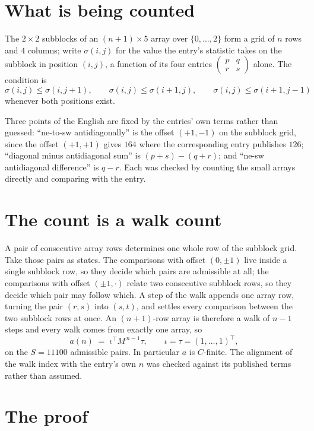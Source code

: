 \documentclass[11pt,a4paper]{article}
\theoremstyle{plain}
\theoremstyle{definition}
\begin{document}
\section{What is being counted}

The $2\times2$ subblocks of an $(n+1)\times5$ array over $\{0,\dots,2\}$ form a grid
of $n$ rows and $4$ columns; write $\sigma(i,j)$ for the value the entry's statistic takes on
the subblock in position $(i,j)$, a function of its four entries
$\begin{pmatrix}p&q\\r&s\end{pmatrix}$ alone. The condition is
\[
\sigma(i,j)\le\sigma(i,j+1),\qquad \sigma(i,j)\le\sigma(i+1,j),\qquad \sigma(i,j)\le\sigma(i+1,j-1)
\]
whenever both positions exist.

Three points of the English are fixed by the entries' own terms rather than guessed:
``ne-to-sw antidiagonally'' is the offset $(+1,-1)$ on the subblock grid, since the offset
$(+1,+1)$ gives $164$ where the corresponding entry publishes $126$; ``diagonal minus
antidiagonal sum'' is $(p+s)-(q+r)$; and ``ne-sw antidiagonal difference'' is $q-r$. Each was
checked by counting the small arrays directly and comparing with the entry.

\section{The count is a walk count}

A pair of consecutive array rows determines one whole row of the subblock grid. Take those
pairs as states. The comparisons with offset $(0,\pm1)$ live inside a single subblock row, so
they decide which pairs are admissible at all; the comparisons with offset $(\pm1,\cdot)$
relate two consecutive subblock rows, so they decide which pair may follow which. A step of the
walk appends one array row, turning the pair $(r,s)$ into $(s,t)$, and settles every comparison
between the two subblock rows at once. An $(n+1)$-row array is therefore a walk of $n-1$ steps
and every walk comes from exactly one array, so
\[
a(n)\;=\;\iota^{\!\top}M^{\,n-1}\tau,\qquad \iota=\tau=(1,\dots,1)^{\!\top},
\]
on the $S=11100$ admissible pairs. In particular $a$ is $C$-finite. The alignment of the walk
index with the entry's own $n$ was checked against its published terms rather than assumed.

\section{The proof}
\end{document}
